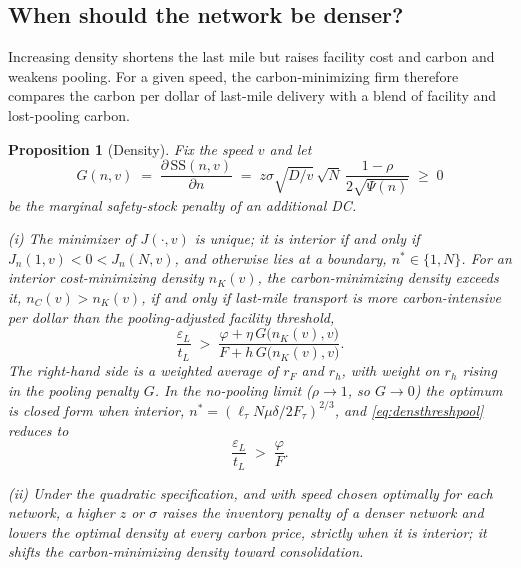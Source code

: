 \documentclass[11pt]{article}
\newtheorem{proposition}{Proposition}
\numberwithin{proposition}{section}
\theoremstyle{definition}
\theoremstyle{remark}
\theoremstyle{plain}
\newcommand{\sstock}{\mathrm{SS}}
\begin{document}
\subsection{When should the network be denser?}\label{sec:density}

Increasing density shortens the last mile but raises facility cost and carbon and weakens pooling. For a given
speed, the carbon-minimizing firm therefore compares the carbon per dollar of last-mile delivery with a blend of
facility and lost-pooling carbon.

\begin{proposition}[Density]\label{prop:density}
Fix the speed $v$ and let
\begin{equation}
  G(n,v)\;=\;\frac{\partial\,\sstock(n,v)}{\partial n}
           \;=\;z\sigma\sqrt{D/v}\,\sqrt{N}\,\frac{1-\rho}{2\sqrt{\Psi(n)}}\;\ge\;0
\end{equation}
be the marginal safety-stock penalty of an additional DC.

\smallskip\noindent\textup{(i)} The minimizer of $J(\cdot,v)$ is unique; it is interior if and only if
$J_n(1,v)<0<J_n(N,v)$, and otherwise lies at a boundary, $n^*\in\{1,N\}$. For an interior cost-minimizing density
$n_K(v)$, the carbon-minimizing density exceeds it, $n_C(v)>n_K(v)$, if and only if last-mile transport is more
carbon-intensive per dollar than the \emph{pooling-adjusted facility threshold},
\begin{equation}\label{eq:densthreshpool}
  \frac{\varepsilon_L}{t_L} \;>\; \frac{\varphi+\eta\,G\big(n_K(v),v\big)}{F+h\,G\big(n_K(v),v\big)} .
\end{equation}
The right-hand side is a weighted average of $r_F$ and $r_h$, with weight on $r_h$ rising in the pooling penalty
$G$. In the no-pooling limit ($\rho\to1$, so $G\to0$) the optimum is closed form when interior,
$n^*=(\ell_\tau N\mu\delta/2F_\tau)^{2/3}$, and \eqref{eq:densthreshpool} reduces to
\begin{equation}\label{eq:densitythreshold}
  \frac{\varepsilon_L}{t_L} \;>\; \frac{\varphi}{F}.
\end{equation}

\smallskip\noindent\textup{(ii)} Under the quadratic specification, and with speed chosen optimally for each
network, a higher $z$ or $\sigma$ raises the inventory penalty of a denser network and lowers the optimal density
at every carbon price, strictly when it is interior; it shifts the carbon-minimizing density toward
consolidation.
\end{proposition}
\end{document}
